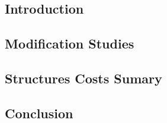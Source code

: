\subsection{Introduction}


\subsection{Modification Studies}



\subsection{Structures Costs Sumary}


\subsection{Conclusion}
